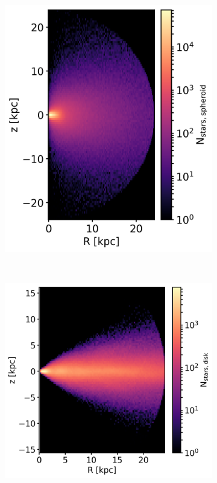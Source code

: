 \begin{figure}[htbp]
\captionsetup{format=plain}
    \centering
    \begin{subfigure}[c]{0.45\textwidth}
    \centering
    	\includegraphics[height=0.25\textheight]{plots/Auriga/spheroid_selection_Rz_snap_127.png}
    \end{subfigure}
    ~ %
    \begin{subfigure}[c]{0.45\textwidth}
        \centering
    	\includegraphics[height=0.25\textheight]{plots/Auriga/disk_selection_Rz_snap_127.png}

\end{subfigure}
\end{figure}
